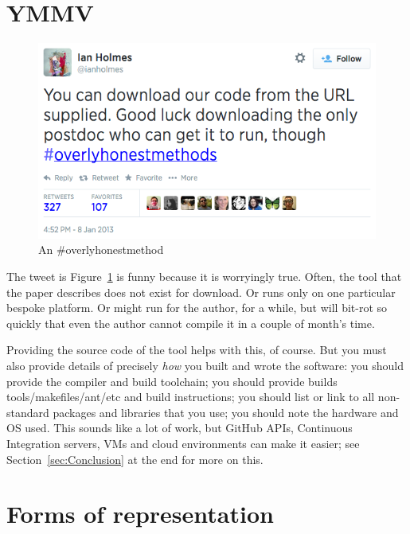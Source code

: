 \documentclass[conference]{IEEEtran}
\begin{document}
\section{YMMV}

\begin{figure}[!ht]
\centering
\includegraphics[width=\columnwidth]{overlyhonesttweet.png}
\caption{An \#overlyhonestmethod}
\label{fig:overlyhonestmethod} 
\end{figure}

The tweet is Figure~\ref{fig:overlyhonestmethod} is funny because it
is worryingly true. Often, the tool that the paper describes does not
exist for download. Or runs only on one particular bespoke
platform. Or might run for the author, for a while, but will bit-rot
so quickly that even the author cannot compile it in a couple of
month's time.

Providing the source code of the tool helps with this, of course. But
you must also provide details of precisely \emph{how} you built and
wrote the software:
%
you should provide the compiler and build toolchain; 
%
you should provide builds tools/makefiles/ant/etc and build instructions; 
%
you should list or link to all non-standard packages and libraries that you use; 
%
you should note the hardware and OS used. 
%
This sounds like a lot of work, but GitHub APIs, Continuous
Integration servers, VMs and cloud environments can make it easier; see
Section~\ref{sec:Conclusion} at the end for more on this.


\section{Forms of representation}
\end{document}
